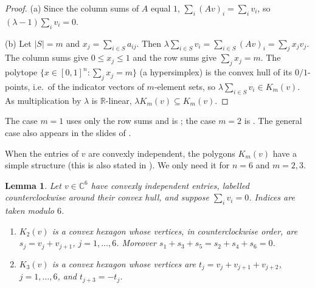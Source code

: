 \documentclass[11pt]{amsart}
\newtheorem{lemma}[theorem]{Lemma}
\theoremstyle{definition}
\theoremstyle{remark}
\newcommand{\C}{\mathbb{C}}
\newcommand{\R}{\mathbb{R}}
\begin{document}
\begin{proof}
(a) Since the column sums of $A$ equal $1$, $\sum_i(Av)_i=\sum_iv_i$, so $(\lambda-1)\sum_iv_i=0$.

(b) Let $\lvert S\rvert=m$ and $x_j=\sum_{i\in S}a_{ij}$. Then $\lambda\sum_{i\in S}v_i=\sum_{i\in S}(Av)_i=\sum_jx_jv_j$. The column sums give $0\le x_j\le1$ and the row sums give $\sum_jx_j=m$. The polytope $\{x\in[0,1]^n:\sum_jx_j=m\}$ (a hypersimplex) is the convex hull of its $0/1$-points, i.e.\ of the indicator vectors of $m$-element sets, so $\lambda\sum_{i\in S}v_i\in K_m(v)$. As multiplication by $\lambda$ is $\R$-linear, $\lambda K_m(v)\subseteq K_m(v)$.
\end{proof}

The case $m=1$ uses only the row sums and is \cite[Proposition~1]{LPK15}; the case $m=2$ is \cite[Corollary~2]{LPK15}. The general case also appears in the slides of \cite{Bou26,BMM26}.

When the entries of $v$ are convexly independent, the polygons $K_m(v)$ have a simple structure (this is also stated in \cite{Bou26,BMM26}). We only need it for $n=6$ and $m=2,3$.

\begin{lemma}\label{lem:structure}
Let $v\in\C^6$ have convexly independent entries, labelled counterclockwise around their convex hull, and suppose $\sum_iv_i=0$. Indices are taken modulo $6$.
\begin{enumerate}[label=\textup{(\alph*)}]
\item $K_2(v)$ is a convex hexagon whose vertices, in counterclockwise order, are $s_j=v_j+v_{j+1}$, $j=1,\dots,6$. Moreover $s_1+s_3+s_5=s_2+s_4+s_6=0$.
\item $K_3(v)$ is a convex hexagon whose vertices are $t_j=v_j+v_{j+1}+v_{j+2}$, $j=1,\dots,6$, and $t_{j+3}=-t_j$.
\end{enumerate}
\end{lemma}
\end{document}
